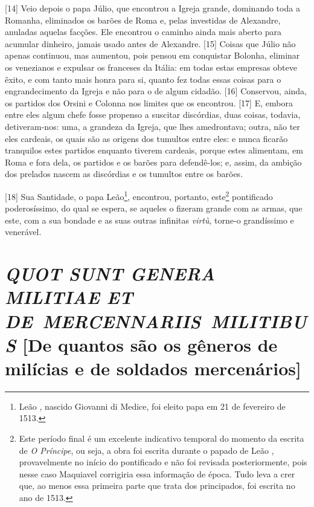 {[}14{]} Veio depois o papa Júlio, que encontrou a Igreja grande,
dominando toda a Romanha, eliminados os barões de Roma e, pelas
investidas de Alexandre, anuladas aquelas facções. Ele encontrou o
caminho ainda mais aberto para acumular dinheiro, jamais usado antes de
Alexandre. {[}15{]} Coisas que Júlio não apenas continuou, mas aumentou,
pois pensou em conquistar Bolonha, eliminar os venezianos e expulsar os
franceses da Itália: em todas estas empresas obteve êxito, e com tanto
mais honra para si, quanto fez todas essas coisas para o engrandecimento
da Igreja e não para o de algum cidadão. {[}16{]} Conservou, ainda, os
partidos dos Orsini e Colonna nos limites que os encontrou. {[}17{]} E,
embora entre eles algum chefe fosse propenso a suscitar discórdias, duas
coisas, todavia, detiveram-nos: uma, a grandeza da Igreja, que lhes
amedrontava; outra, não ter eles cardeais, os quais são as origens dos
tumultos entre eles: e nunca ficarão tranquilos estes partidos enquanto
tiverem cardeais, porque estes alimentam, em Roma e fora dela, os partidos e os barões para
defendê-los; e, assim, da ambição dos prelados nascem as discórdias e os
tumultos entre os barões.

{[}18{]} Sua Santidade, o papa Leão\footnote{Leão , nascido Giovanni di
  Medice, foi eleito papa em 21 de fevereiro de 1513.}, encontrou,
portanto, este\footnote{Este período final é um excelente indicativo
  temporal do momento da escrita de \emph{O Príncipe}, ou seja, a obra
  foi escrita durante o papado de Leão , provavelmente no início do
  pontificado e não foi revisada posteriormente, pois nesse caso
  Maquiavel corrigiria essa informação de época. Tudo leva a crer que,
  ao menos essa primeira parte que trata dos principados, foi escrita no
  ano de 1513.} pontificado poderosíssimo, do qual se espera, se aqueles
o fizeram grande com as armas, que este, com a sua bondade e as suas
outras infinitas \emph{virtù}, torne-o grandíssimo e venerável.

\quebra\section{\emph{QUOT SUNT GENERA MILITIAE ET DE~MERCENNARIIS~MILITIBUS}\break
{[}De quantos são os gêneros de milícias e de soldados mercenários{]}}

